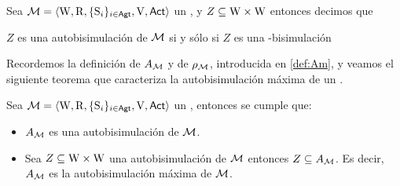 \begin{definicion}
    Sea $\mathcal{M}=\langle \mathrm{W},\mathrm{R},\{ \mathrm{S}_i \}_{i \in {\rm \sf Agt}},\mathrm{V},{\rm \sf Act} \rangle$ un \ults, y $Z \subseteq \mathrm{W} \times \mathrm{W}$ entonces decimos que
    \begin{center}
        $Z$ es una autobisimulación de $\mathcal{M}$ si y sólo si $Z$ es una \KHilogic-bisimulación        
    \end{center}
\end{definicion}

Recordemos la definición de $A_{\mathcal{M}}$ y de $\rho_{\mathcal{M}}$, introducida en \ref{def:Am}, y veamos el siguiente teorema 
que caracteriza la autobisimulación máxima de un \ults.

\begin{teorema}
    Sea $\mathcal{M}=\langle \mathrm{W},\mathrm{R},\{ \mathrm{S}_i \}_{i \in {\rm \sf Agt}},\mathrm{V},{\rm \sf Act} \rangle$ un \ults, entonces se cumple que:
    \begin{itemize}
        \item $A_{\mathcal{M}}$ es una autobisimulación de $\mathcal{M}$.
        \item Sea $Z \subseteq \mathrm{W} \times \mathrm{W}$ una autobisimulación de $\mathcal{M}$ entonces $Z \subseteq A_{\mathcal{M}}$. 
        Es decir, $A_{\mathcal{M}} $ es la autobisimulación máxima de $\mathcal{M}$. 
    \end{itemize}
\end{teorema}

